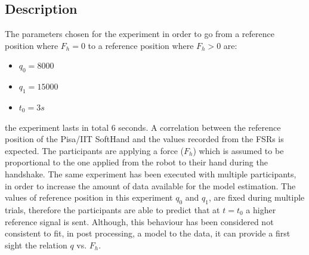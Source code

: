\subsection{Description}
The parameters chosen for the experiment in order to go from a reference position where $F_h=0$ to a reference position where $F_h > 0$ are:
\begin{itemize}
\item $q_0 = 8000 $
\item $q_1 = 15000$
\item $t_0 = 3s$
\end{itemize}
the experiment lasts in total 6 seconds. A correlation between the reference position of the Pisa/IIT SoftHand and the values recorded from the FSRs is expected. The participants are applying a force ($F_{h}$) which is assumed to be proportional to the one applied from the robot to their hand during the handshake.
The same experiment has been executed with multiple participants, in order to increase the amount of data available for the model estimation. The values of reference position in this experiment $q_{0}$ and $q_{1}$, are fixed during multiple trials, therefore the participants are able to predict that at $t=t_0$ a higher reference signal is sent. Although, this behaviour has been considered not consistent to fit, in post processing, a model to the data, it can provide a first sight the relation $q$ vs. $F_h$.
%
%
